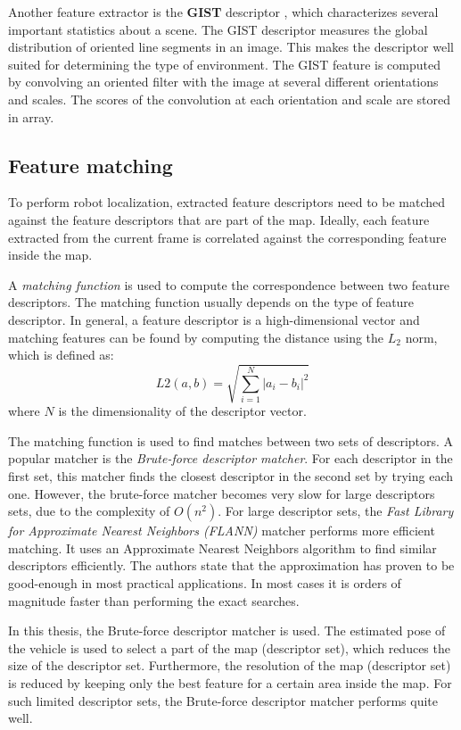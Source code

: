 Another feature extractor is the \textbf{GIST} descriptor \cite{oliva2001modeling}, which characterizes several important statistics about a scene.
The GIST descriptor measures the global distribution of oriented line segments in an image.
This makes the descriptor well suited for determining the type of environment.
The GIST feature is computed by convolving an oriented filter with the image at several different orientations and scales. 
The scores of the convolution at each orientation and scale are stored in array.

\subsection{Feature matching}
\label{sec:theory_feature_matching}
To perform robot localization, extracted feature descriptors need to be matched against the feature descriptors that are part of the map.
Ideally, each feature extracted from the current frame is correlated against the corresponding feature inside the map.

A \textit{matching function} is used to compute the correspondence between two feature descriptors.
The matching function usually depends on the type of feature descriptor.
In general, a feature descriptor is a high-dimensional vector and matching features can be found by computing the distance using the $L_2$ norm, which is defined as:
\begin{equation}
L2(a,b) =\sqrt { \sum_{i=1}^{N} \left| a_i - b_i \right| ^2 }
\end{equation}
where $N$ is the dimensionality of the descriptor vector.

The matching function is used to find matches between two sets of descriptors.
A popular matcher is the \textit{Brute-force descriptor matcher}. For each descriptor in the first set, this matcher finds the closest descriptor in the second set by trying each one.
However, the brute-force matcher becomes very slow for large descriptors sets, due to the complexity of $O(n^2)$.
For large descriptor sets, the \textit{Fast Library for Approximate Nearest Neighbors (FLANN)} \cite{muja2009flann} matcher performs more efficient matching.
It uses an Approximate Nearest Neighbors algorithm to find similar descriptors efficiently.
The authors state that the approximation has proven to be good-enough in most practical applications.
In most cases it is orders of magnitude faster than performing the exact searches.

In this thesis, the Brute-force descriptor matcher is used.
The estimated pose of the vehicle is used to select a part of the map (descriptor set), which reduces the size of the descriptor set.
Furthermore, the resolution of the map (descriptor set) is reduced by keeping only the best feature for a certain area inside the map.
For such limited descriptor sets, the Brute-force descriptor matcher performs quite well.


